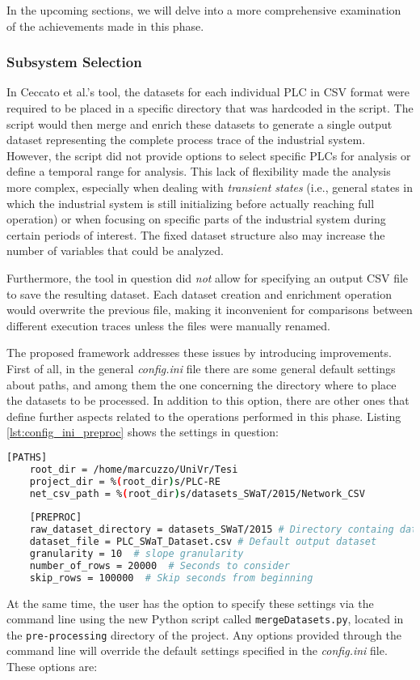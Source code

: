 \bigskip 
In the upcoming sections, we will delve into a more comprehensive examination of the achievements made in this phase.

\subsubsection{Subsystem Selection}
\label{subsubsec:4_select_subsystem}
In Ceccato et al.'s tool, the datasets for each individual PLC in CSV format were required to be placed in a specific directory that was hardcoded in the script. The script would then merge and enrich these datasets to generate a single output dataset representing the complete process trace of the industrial system. However, the script did not provide options to select specific PLCs for analysis or define a temporal range for analysis. This lack of flexibility made the analysis more complex, especially when dealing with \textit{transient states} (i.e., general states in which the industrial system is still initializing before actually reaching full operation) or when focusing on specific parts of the industrial system during certain periods of interest. The fixed dataset structure also may increase the number of variables that could be analyzed.

Furthermore, the tool in question did \textit{not} allow for specifying an output CSV file to save the resulting dataset. Each dataset creation and enrichment operation would overwrite the previous file, making it inconvenient for comparisons between different execution traces unless the files were manually renamed.

\bigskip
The proposed framework addresses these issues by introducing improvements. First of all, in the general \textit{config.ini} file there are some general default settings about paths, and among them the one concerning the directory where to place the datasets %
to be processed. In addition to this option, there are other ones that define further aspects related to the operations performed in this phase. Listing \ref{lst:config_ini_preproc} shows the settings in question: 

\begin{lstlisting}[language=bash, numbers=none, caption=Paths and parameters for the Pre-processing phase in \textit{config.ini} file, label=lst:config_ini_preproc]	
	[PATHS]
	root_dir = /home/marcuzzo/UniVr/Tesi
	project_dir = %(root_dir)s/PLC-RE
	net_csv_path = %(root_dir)s/datasets_SWaT/2015/Network_CSV
	
	[PREPROC]
	raw_dataset_directory = datasets_SWaT/2015 # Directory containg datasets
	dataset_file = PLC_SWaT_Dataset.csv # Default output dataset
	granularity = 10  # slope granularity
	number_of_rows = 20000  # Seconds to consider
	skip_rows = 100000  # Skip seconds from beginning
\end{lstlisting}
At the same time, the user has the option to specify these settings via the command line using the new Python script called \texttt{mergeDatasets.py}, located in the \texttt{pre-processing} directory of the project. Any options provided through the command line will override the default settings specified in the \textit{config.ini} file. These options are:

